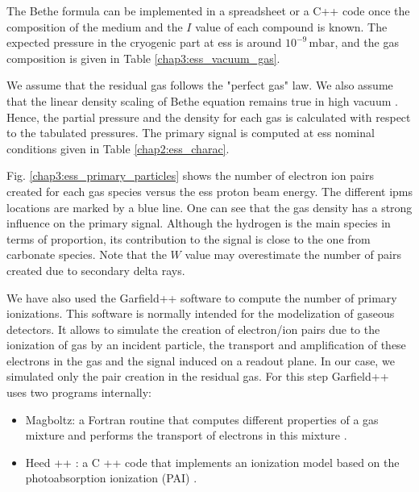 \begin{refsection}
  The Bethe formula can be implemented in a spreadsheet or a C++ code once the composition of the medium and the \(I\) value of each compound is known. The expected pressure in the cryogenic part at \acrshort{ess} is around \(10^{-9}\,\mathrm{mbar}\), and the gas composition is given in Table \ref{chap3:ess_vacuum_gas}.

  

  We assume that the residual gas follows the "perfect gas" law. We also assume that the linear density scaling of Bethe equation remains true in high vacuum \cite[p. 108]{egber2012}\cite{Ishimaru1995}. Hence, the partial pressure and the density for each gas is calculated with respect to the tabulated pressures. The primary signal is computed at \acrshort{ess} nominal conditions given in Table \ref{chap2:ess_charac}.

  Fig. \ref{chap3:ess_primary_particles} shows the number of electron ion pairs created for each gas species versus the \acrshort{ess} proton beam energy. The different \acrshort{ipm}s locations are marked by a blue line. One can see that the gas density has a strong influence on the primary signal. Although the hydrogen is the main species in terms of proportion, its contribution to the signal is close to the one from carbonate species. Note that the \(W\) value may overestimate the number of pairs created due to secondary delta rays.

  

  We have also used the Garfield++ software to compute the number of primary  ionizations. This software is normally intended for the modelization of gaseous detectors. It allows to simulate the creation of electron/ion pairs due to the ionization of gas by an incident particle, the transport and amplification of these electrons in the gas and the signal induced on a readout plane. In our case, we simulated only the pair creation in the residual gas. For this step Garfield++ uses two programs internally:
  \begin{itemize}
    \item Magboltz: a Fortran routine that computes different properties of a gas mixture and performs the transport of electrons in this mixture \cite{Biagi1989}.
    \item Heed ++ \cite{Smirnov2005}: a C ++ code that implements an ionization model based on the photoabsorption ionization (PAI) \cite{Allison1980}.
  \end{itemize}


\end{refsection}
